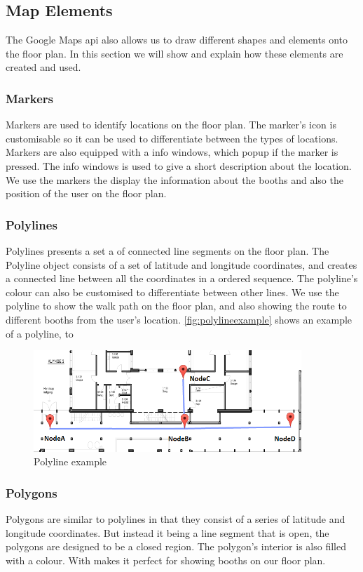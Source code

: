 \subsection*{Map Elements}
The Google Maps \ac{api} also allows us to draw different shapes and elements onto the floor plan. In this section we will show and explain how these elements are created and used.
\subsubsection*{Markers}
Markers are used to identify locations on the floor plan. The marker's icon is customisable so it can be used to differentiate between the types of locations. Markers are also equipped with a info windows, which popup if the marker is pressed. The info windows is used to give a short description about the location. We use the markers the display the information about the booths and also the position of the user on the floor plan.
\subsubsection*{Polylines}
Polylines presents a set a of connected line segments on the floor plan. The Polyline object consists of a set of latitude and longitude coordinates, and creates a connected line between all the coordinates in a ordered sequence. The polyline's colour can also be customised to differentiate between other lines. We use the polyline to show the walk path on the floor plan, and also showing the route to different booths from the user's location. \autoref{fig:polylineexample} shows an example of a polyline, to 
\begin{figure}[H]
\centering
\includegraphics[width=0.9\textwidth]{img/polylineExample.png}
\caption{Polyline example}
\label{fig:polylineexample}
\end{figure}

\subsubsection*{Polygons}
Polygons are similar to polylines in that they consist of a series of latitude and longitude coordinates. But instead it being a line segment that is open, the polygons are designed to be a closed region. The polygon's interior is also filled with a colour. With makes it perfect for showing booths on our floor plan.

